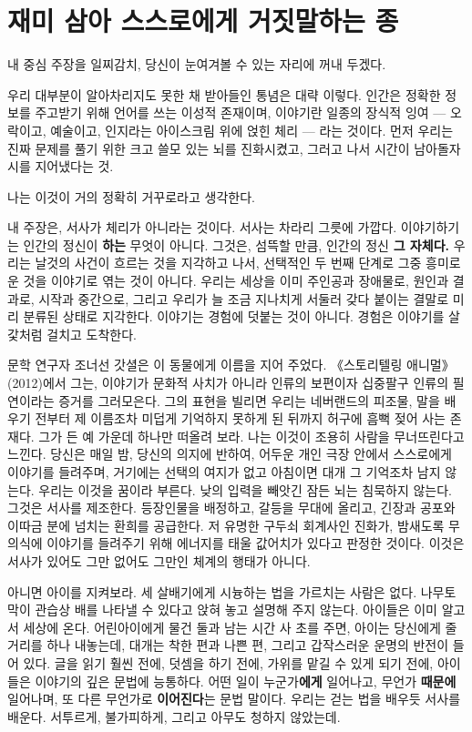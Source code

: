 \section*{재미 삼아 스스로에게 거짓말하는 종}

내 중심 주장을 일찌감치, 당신이 눈여겨볼 수 있는 자리에 꺼내 두겠다.

우리 대부분이 알아차리지도 못한 채 받아들인 통념은 대략 이렇다. 인간은 정확한 정보를 주고받기 위해 언어를 쓰는 이성적 존재이며, 이야기란 일종의 장식적 잉여 — 오락이고, 예술이고, 인지라는 아이스크림 위에 얹힌 체리 — 라는 것이다. 먼저 우리는 진짜 문제를 풀기 위한 크고 쓸모 있는 뇌를 진화시켰고, 그러고 나서 시간이 남아돌자 시를 지어냈다는 것.

나는 이것이 거의 정확히 거꾸로라고 생각한다.

내 주장은, 서사가 체리가 아니라는 것이다. 서사는 차라리 그릇에 가깝다. 이야기하기는 인간의 정신이 \textbf{하는} 무엇이 아니다. 그것은, 섬뜩할 만큼, 인간의 정신 \textbf{그 자체다.} 우리는 날것의 사건이 흐르는 것을 지각하고 나서, 선택적인 두 번째 단계로 그중 흥미로운 것을 이야기로 엮는 것이 아니다. 우리는 세상을 이미 주인공과 장애물로, 원인과 결과로, 시작과 중간으로, 그리고 우리가 늘 조금 지나치게 서둘러 갖다 붙이는 결말로 미리 분류된 상태로 지각한다. 이야기는 경험에 덧붙는 것이 아니다. 경험은 이야기를 살갗처럼 걸치고 도착한다.

문학 연구자 조너선 갓셜은 이 동물에게 이름을 지어 주었다. 《스토리텔링 애니멀》(2012)에서 그는, 이야기가 문화적 사치가 아니라 인류의 보편이자 십중팔구 인류의 필연이라는 증거를 그러모은다. 그의 표현을 빌리면 우리는 네버랜드의 피조물, 말을 배우기 전부터 제 이름조차 미덥게 기억하지 못하게 된 뒤까지 허구에 흠뻑 젖어 사는 존재다. 그가 든 예 가운데 하나만 떠올려 보라. 나는 이것이 조용히 사람을 무너뜨린다고 느낀다. 당신은 매일 밤, 당신의 의지에 반하여, 어두운 개인 극장 안에서 스스로에게 이야기를 들려주며, 거기에는 선택의 여지가 없고 아침이면 대개 그 기억조차 남지 않는다. 우리는 이것을 꿈이라 부른다. 낮의 입력을 빼앗긴 잠든 뇌는 침묵하지 않는다. 그것은 서사를 제조한다. 등장인물을 배정하고, 갈등을 무대에 올리고, 긴장과 공포와 이따금 분에 넘치는 환희를 공급한다. 저 유명한 구두쇠 회계사인 진화가, 밤새도록 무의식에 이야기를 들려주기 위해 에너지를 태울 값어치가 있다고 판정한 것이다. 이것은 서사가 있어도 그만 없어도 그만인 체계의 행태가 아니다.

아니면 아이를 지켜보라. 세 살배기에게 시늉하는 법을 가르치는 사람은 없다. 나무토막이 관습상 배를 나타낼 수 있다고 앉혀 놓고 설명해 주지 않는다. 아이들은 이미 알고서 세상에 온다. 어린아이에게 물건 둘과 남는 시간 사 초를 주면, 아이는 당신에게 줄거리를 하나 내놓는데, 대개는 착한 편과 나쁜 편, 그리고 갑작스러운 운명의 반전이 들어 있다. 글을 읽기 훨씬 전에, 덧셈을 하기 전에, 가위를 맡길 수 있게 되기 전에, 아이들은 이야기의 깊은 문법에 능통하다. 어떤 일이 누군가\textbf{에게} 일어나고, 무언가 \textbf{때문에} 일어나며, 또 다른 무언가로 \textbf{이어진다}는 문법 말이다. 우리는 걷는 법을 배우듯 서사를 배운다. 서투르게, 불가피하게, 그리고 아무도 청하지 않았는데.


